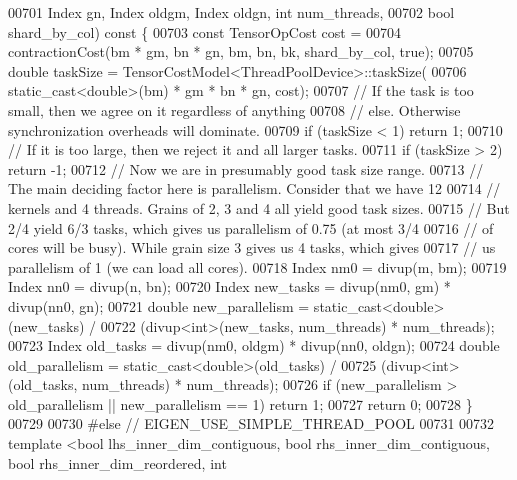 \begin{DoxyCode}
00701                  Index gn, Index oldgm, Index oldgn, \textcolor{keywordtype}{int} num\_threads,
00702                  \textcolor{keywordtype}{bool} shard\_by\_col)\textcolor{keyword}{ const }\{
00703     \textcolor{keyword}{const} TensorOpCost cost =
00704         contractionCost(bm * gm, bn * gn, bm, bn, bk, shard\_by\_col, \textcolor{keyword}{true});
00705     \textcolor{keywordtype}{double} taskSize = TensorCostModel<ThreadPoolDevice>::taskSize(
00706         static\_cast<double>(bm) * gm * bn * gn, cost);
00707     \textcolor{comment}{// If the task is too small, then we agree on it regardless of anything}
00708     \textcolor{comment}{// else. Otherwise synchronization overheads will dominate.}
00709     \textcolor{keywordflow}{if} (taskSize < 1) \textcolor{keywordflow}{return} 1;
00710     \textcolor{comment}{// If it is too large, then we reject it and all larger tasks.}
00711     \textcolor{keywordflow}{if} (taskSize > 2) \textcolor{keywordflow}{return} -1;
00712     \textcolor{comment}{// Now we are in presumably good task size range.}
00713     \textcolor{comment}{// The main deciding factor here is parallelism. Consider that we have 12}
00714     \textcolor{comment}{// kernels and 4 threads. Grains of 2, 3 and 4 all yield good task sizes.}
00715     \textcolor{comment}{// But 2/4 yield 6/3 tasks, which gives us parallelism of 0.75 (at most 3/4}
00716     \textcolor{comment}{// of cores will be busy). While grain size 3 gives us 4 tasks, which gives}
00717     \textcolor{comment}{// us parallelism of 1 (we can load all cores).}
00718     Index nm0 = divup(m, bm);
00719     Index nn0 = divup(n, bn);
00720     Index new\_tasks = divup(nm0, gm) * divup(nn0, gn);
00721     \textcolor{keywordtype}{double} new\_parallelism = \textcolor{keyword}{static\_cast<}\textcolor{keywordtype}{double}\textcolor{keyword}{>}(new\_tasks) /
00722                              (divup<int>(new\_tasks, num\_threads) * num\_threads);
00723     Index old\_tasks = divup(nm0, oldgm) * divup(nn0, oldgn);
00724     \textcolor{keywordtype}{double} old\_parallelism = \textcolor{keyword}{static\_cast<}\textcolor{keywordtype}{double}\textcolor{keyword}{>}(old\_tasks) /
00725                              (divup<int>(old\_tasks, num\_threads) * num\_threads);
00726     \textcolor{keywordflow}{if} (new\_parallelism > old\_parallelism || new\_parallelism == 1) \textcolor{keywordflow}{return} 1;
00727     \textcolor{keywordflow}{return} 0;
00728   \}
00729 
00730 \textcolor{preprocessor}{#else  // EIGEN\_USE\_SIMPLE\_THREAD\_POOL}
00731 
00732   \textcolor{keyword}{template} <\textcolor{keywordtype}{bool} lhs\_inner\_dim\_contiguous, \textcolor{keywordtype}{bool} rhs\_inner\_dim\_contiguous, \textcolor{keywordtype}{bool} rhs\_inner\_dim\_reordered, \textcolor{keywordtype}{int}

\end{DoxyCode}
